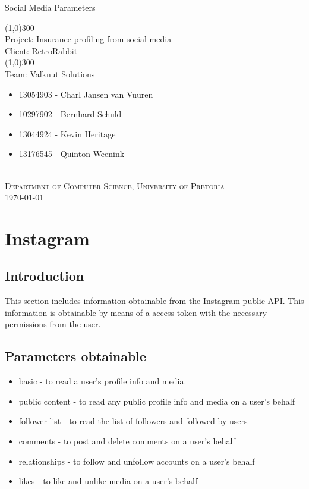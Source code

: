 \documentclass{article}
\begin{document}
	\begin{titlepage}
		\begin{center}
		
			\huge{
			Social Media Parameters\\
			}
			
			\line(1,0){300}\\
			[0.2cm]
			\LARGE{Project: Insurance profiling from social media\\
			Client: RetroRabbit} \\
			\line(1,0){300}\\
			\LARGE{Team: Valknut Solutions}\\
			[1.0cm]
			\large
			{
			\begin{itemize}
				\item 13054903 - Charl Jansen van Vuuren 
				\item 10297902 - Bernhard Schuld      
				\item 13044924 - Kevin Heritage
				\item 13176545 - Quinton Weenink\\
			\end{itemize}
			}
			\textsc{\large}\\
		[6.0cm]
		\textsc{\large  Department of Computer Science, University of Pretoria}\\
		[0.5cm]
		\textsc{\large \today}\\
		\end{center}

	\end{titlepage}
	\cleardoublepage
	\tableofcontents
	\cleardoublepage

\section{Instagram}

\subsection{Introduction}
This section includes information obtainable from the Instagram public API. This information is obtainable by means of a access token with the necessary permissions from the user.
\subsection{Parameters obtainable}
\begin{itemize}
	\item basic - to read a user’s profile info and media.
	\item public content - to read any public profile info and media on a user’s behalf
	\item follower list - to read the list of followers and followed-by users
	\item comments - to post and delete comments on a user’s behalf
	\item relationships - to follow and unfollow accounts on a user’s behalf
	\item likes - to like and unlike media on a user’s behalf
\end{itemize}
\end{document}
